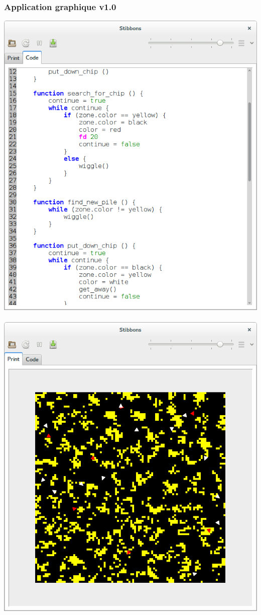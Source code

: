 \begin{frame}
\frametitle{Application graphique v1.0}
\begin{center}
\includegraphics[scale=0.16]{doc/report/screenshot/stibbons-0-5-2.png}
~~~~~~~~
\includegraphics[scale=0.16]{doc/report/screenshot/stibbons-0-5-3.png}
\end{center}


\end{frame}
